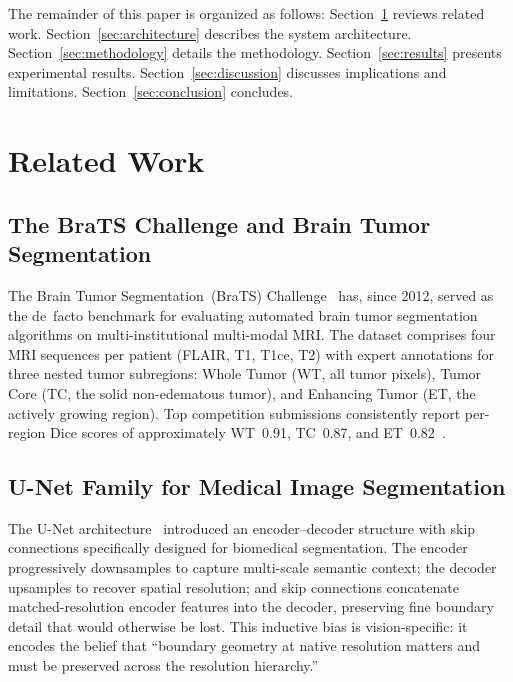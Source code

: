 \documentclass[conference]{IEEEtran}
\begin{document}
The remainder of this paper is organized as follows:
Section~\ref{sec:related} reviews related work.
Section~\ref{sec:architecture} describes the system architecture.
Section~\ref{sec:methodology} details the methodology.
Section~\ref{sec:results} presents experimental results.
Section~\ref{sec:discussion} discusses implications and limitations.
Section~\ref{sec:conclusion} concludes.

\section{Related Work}
\label{sec:related}

\subsection{The BraTS Challenge and Brain Tumor Segmentation}

The Brain Tumor Segmentation~(BraTS)
Challenge~\cite{bakas2018brats,menze2014brats} has, since 2012, served
as the de~facto benchmark for evaluating automated brain tumor
segmentation algorithms on multi-institutional multi-modal MRI. The
dataset comprises four MRI sequences per patient (FLAIR, T1, T1ce, T2)
with expert annotations for three nested tumor subregions: Whole Tumor
(WT, all tumor pixels), Tumor Core (TC, the solid non-edematous tumor),
and Enhancing Tumor (ET, the actively growing region). Top competition
submissions consistently report per-region Dice scores of approximately
WT~0.91, TC~0.87, and ET~0.82~\cite{bakas2018brats}.

\subsection{U-Net Family for Medical Image Segmentation}

The U-Net architecture~\cite{ronneberger2015unet} introduced an
encoder--decoder structure with skip connections specifically designed
for biomedical segmentation. The encoder progressively downsamples to
capture multi-scale semantic context; the decoder upsamples to recover
spatial resolution; and skip connections concatenate matched-resolution
encoder features into the decoder, preserving fine boundary detail that
would otherwise be lost. This inductive bias is vision-specific: it
encodes the belief that ``boundary geometry at native resolution matters
and must be preserved across the resolution hierarchy.''
\end{document}
